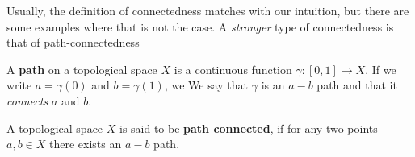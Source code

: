 Usually, the definition of connectedness matches with our intuition, but there are some examples where that is not the case. 
A \emph{stronger} type of connectedness is that of path-connectedness

\begin{dfn}[]
  A \textbf{path} on a topological space $X$ is a continuous function $\gamma: [0,1] \to X$. 
  If we write $a = \gamma(0)$ and $b = \gamma(1)$, we
  We say that $\gamma$ is an $a-b$ path and that it \emph{connects} $a$ and $b$.

  A topological space $X$ is said to be \textbf{path connected}, if for any two points $a,b \in X$ there exists an $a-b$ path.
\end{dfn}





